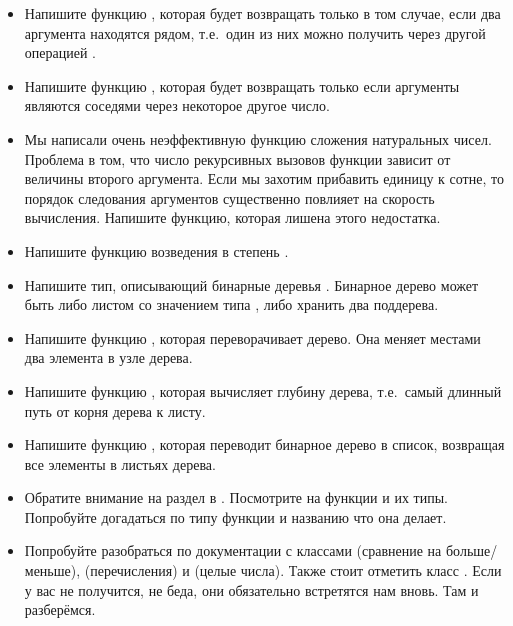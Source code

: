 \begin{itemize}

\item Напишите функцию , которая
        будет возвращать  только в том случае, если
        два аргумента находятся рядом, т.е.~один из них можно
        получить через другой операцией .

\item Напишите функцию , которая
        будет возвращать  только если аргументы
        являются соседями через некоторое другое число. 

\item Мы написали очень неэффективную функцию сложения 
натуральных чисел. Проблема в том, что число рекурсивных вызовов
функции зависит от величины второго аргумента. Если мы захотим прибавить
единицу к сотне, то порядок следования аргументов существенно
повлияет на скорость вычисления. Напишите функцию, которая
лишена этого недостатка.

\item Напишите функцию возведения в степень .

\item Напишите тип, описывающий бинарные деревья . 
        Бинарное дерево может быть либо листом со значением типа ,
        либо хранить два поддерева.

\item Напишите функцию ,
        которая переворачивает дерево. Она меняет местами два элемента
        в узле дерева.

\item Напишите функцию , которая
        вычисляет глубину дерева, т.е.~самый длинный путь от корня дерева
        к листу.

\item Напишите функцию , которая
        переводит бинарное дерево в список, возвращая все элементы
        в листьях дерева.  

\item Обратите внимание на раздел  в . 
        Посмотрите на функции и их типы. Попробуйте догадаться
        по типу функции и названию что она делает.

\item Попробуйте разобраться по документации с классами 
        (сравнение на больше/меньше),  (перечисления) и 
         (целые числа). Также стоит отметить
        класс .
        Если у вас не получится, не беда, они обязательно
        встретятся нам вновь. Там и разберёмся.
                

\end{itemize}
